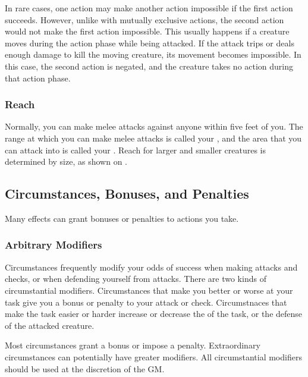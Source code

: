          In rare cases, one action may make another action impossible if the first action succeeds.
        However, unlike with mutually exclusive actions, the second action would not make the first action impossible.
        This usually happens if a creature moves during the action phase while being attacked.
        If the attack trips or deals enough damage to kill the moving creature, its movement becomes impossible.
        In this case, the second action is negated, and the creature takes no action during that action phase.

        \subsubsection{Reach}\label{Reach}
            Normally, you can make melee attacks against anyone within five feet of you.
            The range at which you can make melee attacks is called your , and the area that you can attack into is called your .
            Reach for larger and smaller creatures is determined by size, as shown on .

    \subsection{Circumstances, Bonuses, and Penalties}

        Many effects can grant bonuses or penalties to actions you take.

        \subsubsection{Arbitrary Modifiers}

            Circumstances frequently modify your odds of success when making attacks and checks, or when defending yourself from attacks.
            There are two kinds of circumstantial modifiers.
            Circumstances that make you better or worse at your task give you a bonus or penalty to your attack or check.
            Circumstnaces that make the task easier or harder increase or decrease the  of the task, or the defense of the attacked creature.

            Most circumstances grant a  bonus or impose a  penalty.
            Extraordinary circumstances can potentially have greater modifiers.
            All circumstantial modifiers should be used at the discretion of the GM.\@

